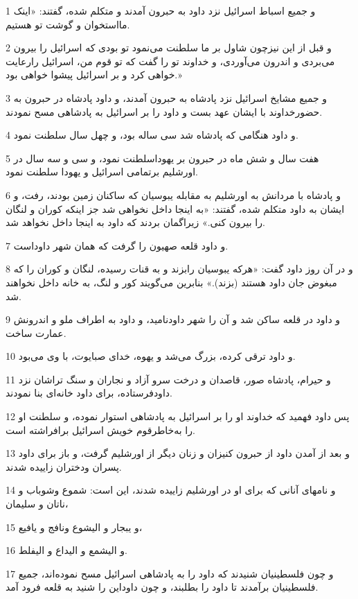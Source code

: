 \par 1 و جمیع اسباط اسرائیل نزد داود به حبرون آمدند و متکلم شده، گفتند: «اینک مااستخوان و گوشت تو هستیم.
\par 2 و قبل از این نیزچون شاول بر ما سلطنت می‌نمود تو بودی که اسرائیل را بیرون می‌بردی و اندرون می‌آوردی، و خداوند تو را گفت که تو قوم من، اسرائیل رارعایت خواهی کرد و بر اسرائیل پیشوا خواهی بود.»
\par 3 و جمیع مشایخ اسرائیل نزد پادشاه به حبرون آمدند، و داود پادشاه در حبرون به حضورخداوند با ایشان عهد بست و داود را بر اسرائیل به پادشاهی مسح نمودند.
\par 4 و داود هنگامی که پادشاه شد سی ساله بود، و چهل سال سلطنت نمود.
\par 5 هفت سال و شش ماه در حبرون بر یهوداسلطنت نمود، و سی و سه سال در اورشلیم برتمامی اسرائیل و یهودا سلطنت نمود.
\par 6 و پادشاه با مردانش به اورشلیم به مقابله یبوسیان که ساکنان زمین بودند، رفت، و ایشان به داود متکلم شده، گفتند: «به اینجا داخل نخواهی شد جز اینکه کوران و لنگان را بیرون کنی.» زیراگمان بردند که داود به اینجا داخل نخواهد شد.
\par 7 و داود قلعه صهیون را گرفت که همان شهر داوداست.
\par 8 و در آن روز داود گفت: «هر‌که یبوسیان رابزند و به قنات رسیده، لنگان و کوران را که مبغوض جان داود هستند (بزند).» بنابرین می‌گویند کور و لنگ، به خانه داخل نخواهند شد.
\par 9 و داود در قلعه ساکن شد و آن را شهر داودنامید، و داود به اطراف ملو و اندرونش عمارت ساخت.
\par 10 و داود ترقی کرده، بزرگ می‌شد و یهوه، خدای صبایوت، با وی می‌بود.
\par 11 و حیرام، پادشاه صور، قاصدان و درخت سرو آزاد و نجاران و سنگ تراشان نزد داودفرستاده، برای داود خانه‌ای بنا نمودند.
\par 12 پس داود فهمید که خداوند او را بر اسرائیل به پادشاهی استوار نموده، و سلطنت او را به‌خاطرقوم خویش اسرائیل برافراشته است.
\par 13 و بعد از آمدن داود از حبرون کنیزان و زنان دیگر از اورشلیم گرفت، و باز برای داود پسران ودختران زاییده شدند.
\par 14 و نامهای آنانی که برای او در اورشلیم زاییده شدند، این است: شموع وشوباب و ناتان و سلیمان،
\par 15 و یبجار و الیشوع ونافج و یافیع،
\par 16 و الیشمع و الیداع و الیفلط.
\par 17 و چون فلسطینیان شنیدند که داود را به پادشاهی اسرائیل مسح نموده‌اند، جمیع فلسطینیان برآمدند تا داود را بطلبند، و چون داوداین را شنید به قلعه فرود آمد.
